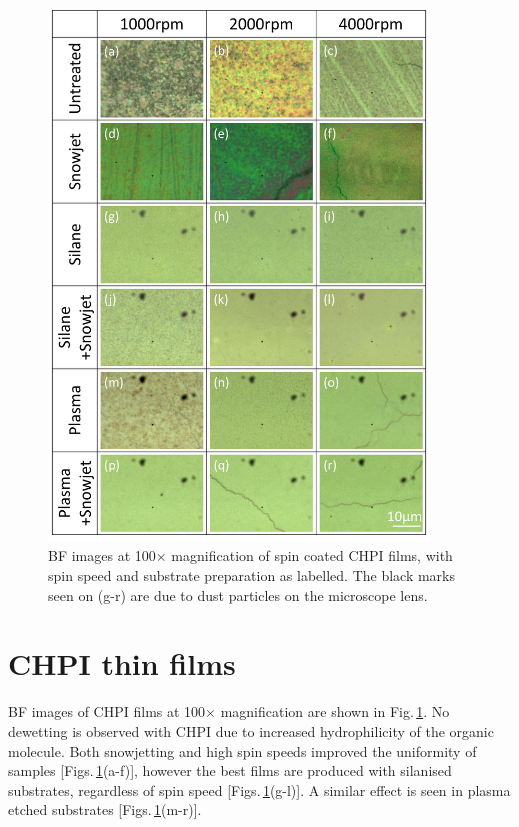 \begin{figure}[h!] 
\centering    
\includegraphics[width=0.9\textwidth]{Fig5}
\caption{BF images at 100$\times$ magnification of spin coated CHPI films, with spin speed and substrate preparation as labelled. The black marks seen on (g-r) are due to dust particles on the microscope lens.}
\label{4Fig5}
\end{figure}
\section{CHPI thin films}
BF images of CHPI films at 100$\times$ magnification are shown in Fig.\,\ref{4Fig5}. No dewetting is observed with CHPI due to increased hydrophilicity of the organic molecule. Both snowjetting and high spin speeds improved the uniformity of samples [Figs.\,\ref{4Fig5}(a-f)], however the best films are produced with silanised substrates, regardless of spin speed [Figs.\,\ref{4Fig5}(g-l)]. A similar effect is seen in plasma etched substrates [Figs.\,\ref{4Fig5}(m-r)].

